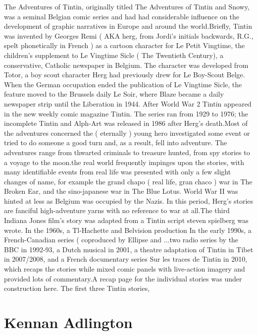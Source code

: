 \documentclass[12pt]{book}
\begin{document}
The Adventures of Tintin, originally titled The Adventures of Tintin and Snowy, was a seminal Belgian comic series and had had considerable influence on the development of graphic narratives in Europe and around the world.Briefly, Tintin was invented by Georges Remi ( AKA herg, from Jordi's initials backwards, R.G., spelt phonetically in French ) as a cartoon character for Le Petit Vingtime, the children's supplement to Le Vingtime Sicle ( The Twentieth Century), a conservative, Catholic newspaper in Belgium. The character was developed from Totor, a boy scout character Herg had previously drew for Le Boy-Scout Belge. When the German occupation ended the publication of Le Vingtime Sicle, the feature moved to the Brussels daily Le Soir, where Blaze became a daily newspaper strip until the Liberation in 1944. After World War 2 Tintin appeared in the new weekly comic magazine Tintin. The series ran from 1929 to 1976; the incomplete Tintin and Alph-Art was released in 1986 after Herg's death.Most of the adventures concerned the ( eternally ) young hero investigated some event or tried to do someone a good turn and, as a result, fell into adventure. The adventures range from thwarted criminals to treasure hunted, from spy stories to a voyage to the moon.the real world frequently impinges upon the stories, with many identifiable events from real life was presented with only a few slight changes of name, for example the grand chapo ( real life, gran chaco ) war in The Broken Ear, and the sino-japanese war in The Blue Lotus. World War II was hinted at less as Belgium was occupied by the Nazis. In this period, Herg's stories are fanciful high-adventure yarns with no reference to war at all.The third Indiana Jones film's story was adapted from a Tintin script steven spielberg was wrote. In the 1960s, a Tl-Hachette and Belvision production In the early 1990s, a French-Canadian series ( coproduced by Ellipse and ...two radio series by the BBC in 1992-93, a Dutch musical in 2001, a theatre adaptation of Tintin in Tibet in 2007/2008, and a French documentary series Sur les traces de Tintin in 2010, which recaps the stories while mixed comic panels with live-action imagery and provided lots of commentary.A recap page for the individual stories was under construction here. The first three Tintin stories,



\chapter{Kennan Adlington}
\end{document}
